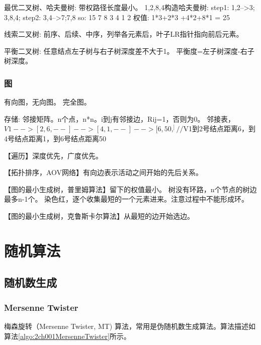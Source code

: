 \documentclass[UTF8]{../computerUniverse}
\begin{document}
最优二叉树、哈夫曼树: 带权路径长度最小。 
1,2,8,4构造哈夫曼树: 
step1: 1,2-->3; 3,8,4;
step2: 3,4-->7;7,8
so:        15
      7       8
   3    4
1    2
权值:  1*3+2*3 +4*2+8*1 = 25

线索二叉树: 前序、后续、中序，列举各元素后，叶子LR指针指向前后元素。

平衡二叉树: 
任意结点左子树与右子树深度差不大于1。
平衡度=左子树深度-右子树深度。



\subsection{图}
有向图，无向图。
完全图。

存储: 
邻接矩阵。n个点，n*n。i到j有邻接边，Rij=1，否则为0。
邻接表，$V1-->[2,6,--]-->[4,1,--]-->[6,50,^]//$V1到2号结点距离6，到4号结点距离1，到6号结点距离50

【遍历】深度优先，广度优先。

【拓扑排序，AOV网络】有向边表示活动之间开始的先后关系。

【图的最小生成树，普里姆算法】留下的权值最小。
树没有环路，n个节点的树边最多n-1个。
染色红，逐个收集最短的一个元素进来。注意过程中不能形成环。

【图的最小生成树，克鲁斯卡尔算法】从最短的边开始选边。




\chapter{随机算法}


\section{随机数生成}

\subsection{Mersenne Twister}
梅森旋转（Mersenne Twister, MT) 算法，常用是伪随机数生成算法。算法描述如算法\ref{algo:2ch001MersenneTwister}所示。
\end{document}
